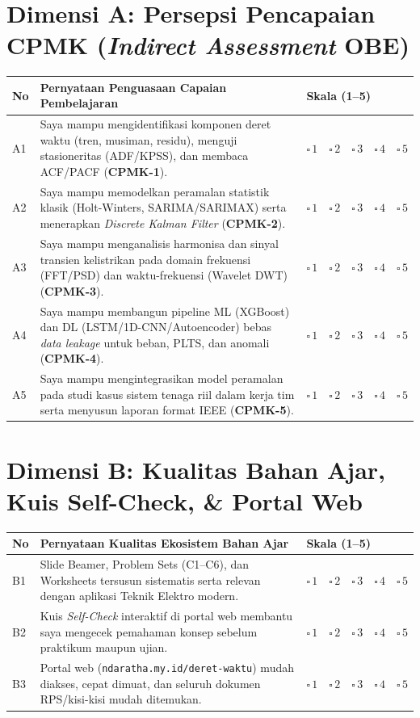 \documentclass[10.5pt,a4paper]{article}
\newcommand{\hdr}[1]{\cellcolor{headerrow}\color{white}\textbf{#1}}
\newcommand{\likert}{$\square\,1 \quad \square\,2 \quad \square\,3 \quad \square\,4 \quad \square\,5$}
\begin{document}
\section{Dimensi A: Persepsi Pencapaian CPMK (\textit{Indirect Assessment} OBE)}
{\small
\renewcommand{\arraystretch}{1.28}
\begin{tabular}{|p{0.6cm}|p{10.5cm}|p{4.8cm}|}
\hline
\hdr{No} & \hdr{Pernyataan Penguasaan Capaian Pembelajaran} & \hdr{Skala (1--5)} \\ \hline
A1 & Saya mampu mengidentifikasi komponen deret waktu (tren, musiman, residu), menguji stasioneritas (ADF/KPSS), dan membaca ACF/PACF (\textbf{CPMK-1}). & \likert \\ \hline
A2 & Saya mampu memodelkan peramalan statistik klasik (Holt-Winters, SARIMA/SARIMAX) serta menerapkan \textit{Discrete Kalman Filter} (\textbf{CPMK-2}). & \likert \\ \hline
A3 & Saya mampu menganalisis harmonisa dan sinyal transien kelistrikan pada domain frekuensi (FFT/PSD) dan waktu-frekuensi (Wavelet DWT) (\textbf{CPMK-3}). & \likert \\ \hline
A4 & Saya mampu membangun pipeline ML (XGBoost) dan DL (LSTM/1D-CNN/Autoencoder) bebas \textit{data leakage} untuk beban, PLTS, dan anomali (\textbf{CPMK-4}). & \likert \\ \hline
A5 & Saya mampu mengintegrasikan model peramalan pada studi kasus sistem tenaga riil dalam kerja tim serta menyusun laporan format IEEE (\textbf{CPMK-5}). & \likert \\ \hline
\end{tabular}
}

\section{Dimensi B: Kualitas Bahan Ajar, Kuis Self-Check, \& Portal Web}
{\small
\renewcommand{\arraystretch}{1.28}
\begin{tabular}{|p{0.6cm}|p{10.5cm}|p{4.8cm}|}
\hline
\hdr{No} & \hdr{Pernyataan Kualitas Ekosistem Bahan Ajar} & \hdr{Skala (1--5)} \\ \hline
B1 & Slide Beamer, Problem Sets (C1--C6), dan Worksheets tersusun sistematis serta relevan dengan aplikasi Teknik Elektro modern. & \likert \\ \hline
B2 & Kuis \textit{Self-Check} interaktif di portal web membantu saya mengecek pemahaman konsep sebelum praktikum maupun ujian. & \likert \\ \hline
B3 & Portal web (\texttt{ndaratha.my.id/deret-waktu}) mudah diakses, cepat dimuat, dan seluruh dokumen RPS/kisi-kisi mudah ditemukan. & \likert \\ \hline
\end{tabular}
}
\end{document}

